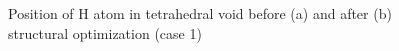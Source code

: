 \begin{figure}[h!]
\begin{minipage}[h]{0.49\linewidth}
\end{minipage}
\hfill
\begin{minipage}[ht]{0.49\linewidth}
\end{minipage}
\caption{Position of H atom in tetrahedral void before (a) and after (b) structural optimization (case 1)}
\label{ris:tet1}
\end{figure}

